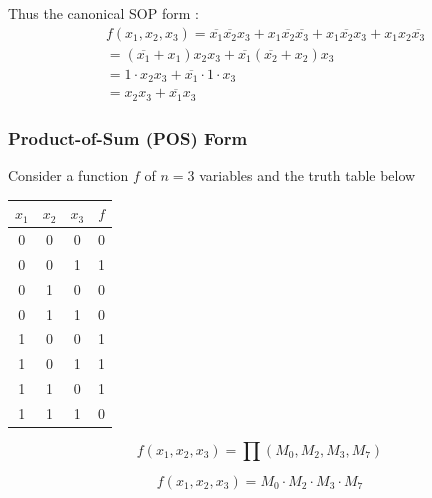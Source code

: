\documentclass[12pt,openany]{book}
\begin{document}
			      	Thus the canonical SOP form :
			      	\begin{align*}
			      		  & f(x_1, x_2, x_3) = \overline{x_1} \overline{x_2} x_3 + x_1 \overline{x_2} \overline{x_3} + x_1 \overline{x_2} x_3 + x_1 x_2 \overline{x_3} \\
			      		  & = (\overline{x_1} + x_1) x_2 x_3 + \overline{x_1} (\overline{x_2} + x_2) x_3                                                               \\
			      		  & = 1 \cdot x_2 x_3 + \overline{x_1} \cdot 1 \cdot x_3                                                                                       \\
			      		  & = x_2 x_3 + \overline{x_1} x_3                                                                                                             
			      	\end{align*}
			      	
			      	
			      	\subsubsection{Product-of-Sum (POS) Form}
			      	Consider a function \( f \) of \( n = 3 \) variables and the truth table below
			      	\begin{center}
			      		\begin{tabular}{ccc|c}
			      			\( x_1 \) & \( x_2 \) & \( x_3 \) & \( f \) \\
			      			\hline
			      			0         & 0         & 0         & 0       \\
			      			0         & 0         & 1         & 1       \\
			      			0         & 1         & 0         & 0       \\
			      			0         & 1         & 1         & 0       \\
			      			1         & 0         & 0         & 1       \\
			      			1         & 0         & 1         & 1       \\
			      			1         & 1         & 0         & 1       \\
			      			1         & 1         & 1         & 0       \\
			      		\end{tabular}
			      	\end{center}
			      	\[
			      		f(x_1, x_2, x_3) = \prod (M_0, M_2, M_3, M_7)
			      	\]
			      	
			      	\[
			      		f(x_1, x_2, x_3) = M_0 \cdot M_2 \cdot M_3 \cdot M_7
			      	\]
			      	
\end{document}
